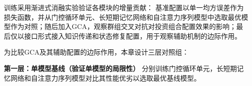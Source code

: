 



训练采用渐进式消融实验验证各模块的增量贡献：
基准配置以单一均方误差作为损失函数，并从门控循环单元、长短期记忆网络和自注意力序列模型中选取最优模型作为对照；随后加入GCA，观察群组交叉对抗对投资组合配置效果的影响；最后仅以接口形式接入知识传递和状态修复配置，用于观察辅助机制的边际作用。

为比较GCA及其辅助配置的边际作用，本章设计三层对照组：

\textbf{第一层：单模型基线（验证单模型的局限性）}
分别训练门控循环单元，长短期记忆网络和自注意力序列模型对比其性能优劣以选取最优基线模型。


